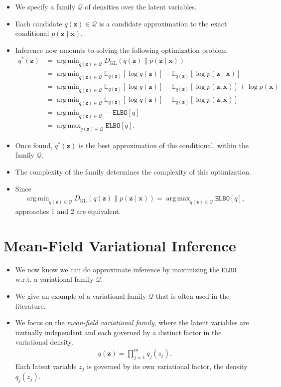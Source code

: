 \documentclass[10pt]{article}
\newcommand{\EE}{\mathbb{E}}
\newcommand{\QQ}{\mathcal{Q}}
\newcommand{\elbo}{\texttt{ELBO}}
\newcommand{\KL}{D_{\text{KL}}}
\DeclareMathOperator*{\argmax}{arg\,max}
\DeclareMathOperator*{\argmin}{arg\,min}
\begin{document}
\begin{itemize}
\item We specify a family $\QQ$ of densities over the latent variables.
\item Each candidate $q(\bm{z}) \in \QQ$ is a candidate approximation to the exact conditional $p(\bm{z} \mid \bm{x})$.
\item Inference now amounts to solving the following optimization problem
\begin{align*}
q^*(\bm{z}) &= \argmin_{q(\bm{z}) \in \QQ} \KL(q(\bm{z}) \| p(\bm{z} \mid \bm{x})) \\
&= \argmin_{q(\bm{z}) \in \QQ} \EE_{q(\bm{z})}[ \log q(\bm{z}) ] - \EE_{q(\bm{z})}[\log p(\bm{z} \mid \bm{x})] \\
&= \argmin_{q(\bm{z}) \in \QQ} \EE_{q(\bm{z})}[ \log q(\bm{z}) ] - \EE_{q(\bm{z})}[\log p(\bm{z}, \bm{x})] + \log p(\bm{x}) \\
&= \argmin_{q(\bm{z}) \in \QQ} \EE_{q(\bm{z})}[ \log q(\bm{z}) ] - \EE_{q(\bm{z})}[\log p(\bm{z}, \bm{x})] \\
&= \argmin_{q(\bm{z}) \in \QQ} - \elbo[q] \\
&= \argmax_{q(\bm{z}) \in \QQ} \elbo[q].
\end{align*}
\item Once found, $q^*(\bm{z})$ is the best approximation of the conditional, within the family $\QQ$.
\item The complexity of the family determines the complexity of this optimization.
\item Since
\begin{align*}
\argmin_{q(\bm{z}) \in \QQ} \KL(q(\bm{z}) \| p(\bm{z} \mid \bm{x})) = \argmax_{q(\bm{z}) \in \QQ} \elbo[q],
\end{align*}
approaches 1 and 2 are equivalent.
\end{itemize}

\newpage

\section{Mean-Field Variational Inference}

\begin{itemize}
\item We now know we can do approximate inference by maximizing the $\elbo$ w.r.t. a variational family $\QQ$.
\item We give an example of a variational family $\QQ$ that is often used in the literature.
\item We focus on the \textit{mean-field variational family}, where the latent variables are mutually independent and each governed by a distinct factor in the variational density.
\begin{align} \label{eq:mf}
q(\bm{z}) = \prod_{j = 1}^m q_j(z_j).
\end{align}
Each latent variable $z_j$ is governed by its own variational factor, the density $q_j(z_j)$.
\end{itemize}
\end{document}
